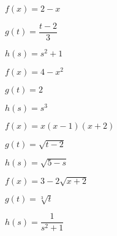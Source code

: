 \begin{shortexenum}[$f(x) = x(x-1)(x+2)$]
\item $f(x) = 2-x$ \label{sketchgraphfirst}
\item $g(t) = \dfrac{t - 2}{3}$
\item $h(s) = s^2 + 1$
\item $f(x) = 4-x^2$
\item $g(t) = 2$
\item $h(s) = s^3$
\item $f(x) = x(x-1)(x+2)$
\item $g(t) = \sqrt{t-2}$
\item $h(s) = \sqrt{5 - s}$
\item $f(x) = 3-2\sqrt{x+2}$
\item $g(t) = \sqrt[3]{t}$
\item $h(s) = \dfrac{1}{s^{2} + 1}$ \label{sketchgraphlast}
\end{shortexenum}

